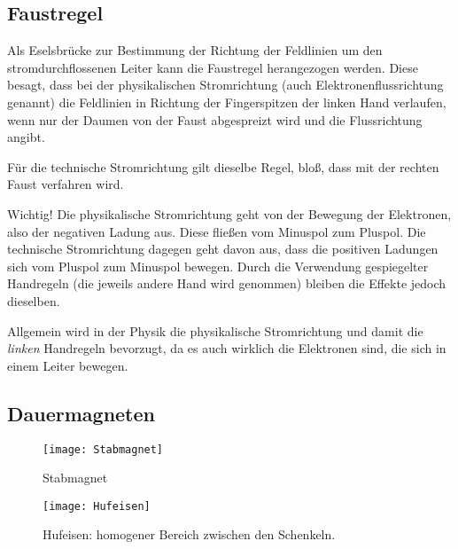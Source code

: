 \subsection{Faustregel}	\label{subsec:Faustregel}

Als Eselsbrücke zur Bestimmung der Richtung der Feldlinien um den stromdurchflossenen Leiter kann die \glqq Faustregel\grqq{} herangezogen werden. Diese besagt, dass bei der physikalischen Stromrichtung (auch Elektronenflussrichtung genannt) die Feldlinien in Richtung der Fingerspitzen der linken Hand verlaufen, wenn nur der Daumen von der Faust abgespreizt wird und die Flussrichtung angibt.

Für die technische Stromrichtung gilt dieselbe Regel, bloß, dass mit der rechten Faust verfahren wird.

\begin{leftbar}
	Wichtig! Die physikalische Stromrichtung geht von der Bewegung der Elektronen, also der negativen Ladung aus. Diese fließen vom Minuspol zum Pluspol. Die technische Stromrichtung dagegen geht davon aus, dass die positiven Ladungen sich vom Pluspol zum Minuspol bewegen. Durch die Verwendung gespiegelter Handregeln (die jeweils andere Hand wird genommen) bleiben die Effekte jedoch dieselben. 
	
	Allgemein wird in der Physik die physikalische Stromrichtung und damit die \emph{linken} Handregeln bevorzugt, da es auch wirklich die Elektronen sind, die sich in einem Leiter bewegen.
\end{leftbar}


\newpage

\subsection{Dauermagneten}  	\label{subsec:DauermagnetFeld}


\begin{figure}[H]
	\centering
	\begin{minipage}[b]{0.45\linewidth}
		\centering
    	\texttt{[image: Stabmagnet]}
		\caption{Stabmagnet}
		\label{fig:stab}
	\end{minipage}
	\quad
	\begin{minipage}[b]{0.45\linewidth}
		\centering
    	\texttt{[image: Hufeisen]}
		\caption{Hufeisen: homogener Bereich zwischen den Schenkeln.}
		\label{fig:hufeisen}
	\end{minipage}
\end{figure}


